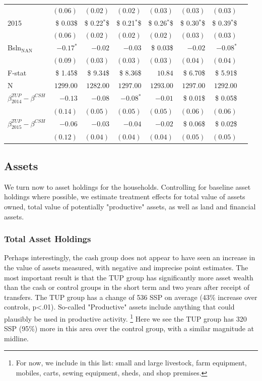 \documentclass[12pt,article]{article}
\begin{document}
\begin{longtable}{lrrrrrrr}
 & $( 0.06)$ & $( 0.02)$ & $( 0.02)$ & $( 0.03)$ & $( 0.03)$ & $( 0.03)$\\
2015 & \$ 0.03\$ & \$ 0.22$^{\textbf{*}}$\$ & \$ 0.21$^{\textbf{*}}$\$ & \$ 0.26$^{\textbf{*}}$\$ & \$ 0.30$^{\textbf{*}}$\$ & \$ 0.39$^{\textbf{*}}$\$\\
 & $( 0.06)$ & $( 0.02)$ & $( 0.02)$ & $( 0.02)$ & $( 0.03)$ & $( 0.03)$\\
Bsln$_{\text{NAN}}$ & $-0.17^{*}$ & $-0.02$ & $-0.03$ & \$ 0.03\$ & $-0.02$ & $-0.08^{*}$\\
 & $( 0.09)$ & $( 0.03)$ & $( 0.03)$ & $( 0.03)$ & $( 0.04)$ & $( 0.04)$\\
\hline
F-stat & \$ 1.45\$ & \$ 9.34\$ & \$ 8.36\$ & $10.84$ & \$ 6.70\$ & \$ 5.91\$\\
N & $1299.00$ & $1282.00$ & $1297.00$ & $1293.00$ & $1297.00$ & $1292.00$\\
\hline
$\beta^{TUP}_{2014}-\beta^{CSH}$ & $-0.13$ & $-0.08$ & $-0.08^{*}$ & $-0.01$ & \$ 0.01\$ & \$ 0.05\$\\
 & $( 0.14)$ & $( 0.05)$ & $( 0.05)$ & $( 0.05)$ & $( 0.06)$ & $( 0.06)$\\
$\beta^{TUP}_{2015}-\beta^{CSH}$ & $-0.06$ & $-0.03$ & $-0.04$ & $-0.02$ & \$ 0.06\$ & \$ 0.02\$\\
 & $( 0.12)$ & $( 0.04)$ & $( 0.04)$ & $( 0.04)$ & $( 0.05)$ & $( 0.05)$\\
\hline
\end{longtable}

\subsection{Assets}
\label{sec-3-4}

We turn now to asset holdings for the households. Controlling for baseline asset holdings
where possible, we estimate treatment effects for total value of assets owned, total
value of potentially "productive" assets, as well as land and financial assets. 

\subsubsection{Total Asset Holdings}
\label{sec-3-4-1}

Perhaps interestingly, the cash group does not appear to have seen an increase in the
value of assets measured, with negative and imprecise point estimates. The most
important result is that the TUP group has significantly more asset wealth than the
cash or control groups in the short term and two years after receipt of transfers.
The TUP group has a change of 536 SSP on average (43\% increase over controls, p<.01).
So-called "Productive" assets include anything that could plausibly be used in
productive activity. \footnote{For now, we include in this list: small and large
livestock, farm equipment, mobiles, carts, sewing equipment, sheds, and shop
premises.} Here we see the TUP group has 320 SSP (95\%) more in this area over the
control group, with a similar magnitude at midline.
\end{document}
